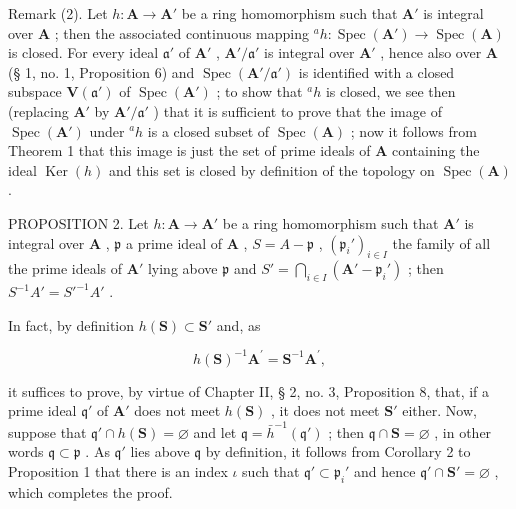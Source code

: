 Remark (2). Let \(h \colon \mathbf{A} \to \mathbf{A}'\) be a ring homomorphism such that \(\mathbf{A}'\) is integral over \(\mathbf{A}\) ; then the associated continuous mapping \(^a h \colon \operatorname{Spec}(\mathbf{A}') \to \operatorname{Spec}(\mathbf{A})\) is closed. For every ideal \(\mathfrak{a}'\) of \(\mathbf{A}'\) , \(\mathbf{A}' / \mathfrak{a}'\) is integral over \(\mathbf{A}'\) , hence also over \(\mathbf{A}\) (§ 1, no. 1, Proposition 6) and \(\operatorname{Spec}(\mathbf{A}' / \mathfrak{a}')\) is identified with a closed subspace \(\mathbf{V}(\mathfrak{a}')\) of \(\operatorname{Spec}(\mathbf{A}')\) ; to show that \(^a h\) is closed, we see then (replacing \(\mathbf{A}'\) by \(\mathbf{A}' / \mathfrak{a}'\) ) that it is sufficient to prove that the image of \(\operatorname{Spec}(\mathbf{A}')\) under \(^a h\) is a closed subset of \(\operatorname{Spec}(\mathbf{A})\) ; now it follows from Theorem 1 that this image is just the set of prime ideals of \(\mathbf{A}\) containing the ideal \(\operatorname{Ker}(h)\) and this set is closed by definition of the topology on \(\operatorname{Spec}(\mathbf{A})\) .

PROPOSITION 2. Let \(h: \mathbf{A} \to \mathbf{A}'\) be a ring homomorphism such that \(\mathbf{A}'\) is integral over \(\mathbf{A}\) , \(\mathfrak{p}\) a prime ideal of \(\mathbf{A}\) , \(S = A - \mathfrak{p}\) , \((\mathfrak{p}_i')_{i \in I}\) the family of all the prime ideals of \(\mathbf{A}'\) lying above \(\mathfrak{p}\) and \(S' = \bigcap_{i \in I} (\mathbf{A}' - \mathfrak{p}_i')\) ; then \(S^{-1}A' = S'^{-1}A'\) .

In fact, by definition \(h(\mathbf{S}) \subset \mathbf{S}'\) and, as

\[
h (\mathbf {S}) ^ {- 1} \mathbf {A} ^ {\prime} = \mathbf {S} ^ {- 1} \mathbf {A} ^ {\prime},
\]

it suffices to prove, by virtue of Chapter II, § 2, no. 3, Proposition 8, that, if a prime ideal \(\mathfrak{q}'\) of \(\mathbf{A}'\) does not meet \(h(\mathbf{S})\) , it does not meet \(\mathbf{S}'\) either. Now, suppose that \(\mathfrak{q}' \cap h(\mathbf{S}) = \varnothing\) and let \(\mathfrak{q} = \bar{h}^{-1}(\mathfrak{q}')\) ; then \(\mathfrak{q} \cap \mathbf{S} = \varnothing\) , in other words \(\mathfrak{q} \subset \mathfrak{p}\) . As \(\mathfrak{q}'\) lies above \(\mathfrak{q}\) by definition, it follows from Corollary 2 to Proposition 1 that there is an index \(\iota\) such that \(\mathfrak{q}' \subset \mathfrak{p}_i'\) and hence \(\mathfrak{q}' \cap \mathbf{S}' = \varnothing\) , which completes the proof.

